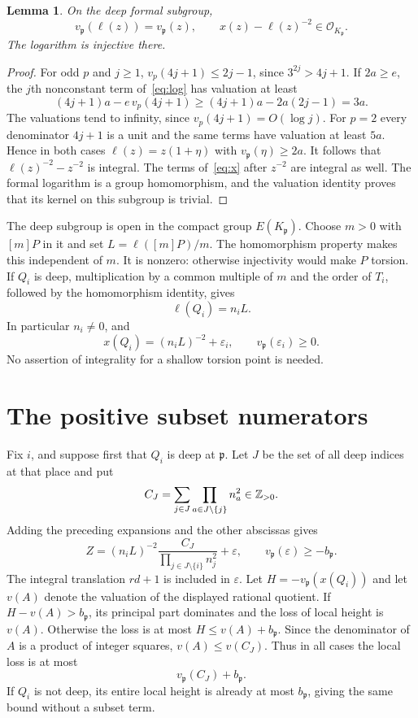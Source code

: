 \documentclass[11pt,a4paper]{article}
\newtheorem{lemma}[theorem]{Lemma}
\begin{document}
\begin{lemma}\label{lem:principal}
On the deep formal subgroup,
\[
 v_\mathfrak p(\ell(z))=v_\mathfrak p(z),\qquad
 x(z)-\ell(z)^{-2}\in\mathcal O_{K_\mathfrak p}.
\]
The logarithm is injective there.
\end{lemma}
\begin{proof}
For odd $p$ and $j\ge1$,
$v_p(4j+1)\le2j-1$, since $3^{2j}>4j+1$.
If $2a\ge e$, the $j$th nonconstant
term of~\eqref{eq:log} has valuation at least
\[
 (4j+1)a-e\,v_p(4j+1)\ge(4j+1)a-2a(2j-1)=3a.
\]
The valuations tend to infinity, since $v_p(4j+1)=O(\log j)$.
For $p=2$ every denominator $4j+1$ is a unit and the same terms
have valuation at least $5a$. Hence in both cases
$\ell(z)=z(1+\eta)$ with $v_\mathfrak p(\eta)\ge2a$.
It follows that $\ell(z)^{-2}-z^{-2}$ is integral.
The terms of~\eqref{eq:x} after $z^{-2}$ are integral as well.
The formal logarithm is a group homomorphism, and the valuation
identity proves that its kernel on this subgroup is trivial.
\end{proof}

The deep subgroup is open in the compact group $E(K_\mathfrak p)$.
Choose $m>0$ with $[m]P$ in it and set $L=\ell([m]P)/m$.
The homomorphism property makes this independent of $m$.
It is nonzero: otherwise injectivity would make $P$ torsion.
If $Q_i$ is deep, multiplication by a common multiple of $m$ and
the order of $T_i$, followed by the homomorphism identity, gives
\[
 \ell(Q_i)=n_iL.
\]
In particular $n_i\ne0$, and
\[
 x(Q_i)=(n_iL)^{-2}+\varepsilon_i,
 \qquad v_\mathfrak p(\varepsilon_i)\ge0.
\]
No assertion of integrality for a shallow torsion point is needed.

\section{The positive subset numerators}

Fix $i$, and suppose first that $Q_i$ is deep at $\mathfrak p$.
Let $J$ be the set of all deep indices at that place and put
\[
 C_J=\sum_{j\in J}\prod_{a\in J\setminus\{j\}}n_a^2
       \in\mathbb Z_{>0}.
\]
Adding the preceding expansions and the other abscissas gives
\[
 Z=(n_iL)^{-2}
      \frac{C_J}{\prod_{j\in J\setminus\{i\}}n_j^2}
      +\varepsilon,
 \qquad v_\mathfrak p(\varepsilon)\ge-b_\mathfrak p.
\]
The integral translation $rd+1$ is included in $\varepsilon$.
Let $H=-v_\mathfrak p(x(Q_i))$ and let $v(A)$ denote the
valuation of the displayed rational quotient.
If $H-v(A)>b_\mathfrak p$, its principal part dominates and
the loss of local height is $v(A)$. Otherwise the loss is at
most $H\le v(A)+b_\mathfrak p$. Since the denominator of $A$
is a product of integer squares, $v(A)\le v(C_J)$.
Thus in all cases the local loss is at most
\[
 v_\mathfrak p(C_J)+b_\mathfrak p.
\]
If $Q_i$ is not deep, its entire local height is already at most
$b_\mathfrak p$, giving the same bound without a subset term.
\end{document}

